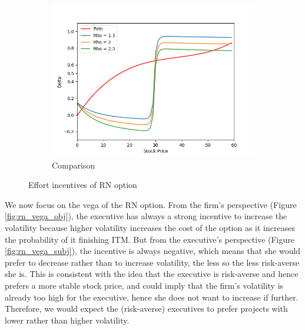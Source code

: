 \begin{figure}[H]
\begin{subfigure}{0.32\textwidth}
        \centering
        \includegraphics[width=\textwidth]{fig/4/delta_comp.png}
        \caption{Comparison}
        \label{fig:rn_delta_comp}
    \end{subfigure}
    \caption{Effort incentives of RN option}
    \label{fig:rn_delta_both}
\end{figure}
\vspace*{15pt}

We now focus on the vega of the RN option. From the firm's perspective (Figure \ref*{fig:rn_vega_obj}), the executive has always a strong incentive to increase the volatility because higher volatility increases the cost of the option as it increases the probability of it finishing ITM. But from the executive's perspective (Figure \ref*{fig:rn_vega_subj}), the incentive is always negative, which means that she would prefer to decrease rather than to increase volatility, the less so the less risk-averse she is. This is consistent with the idea that the executive is risk-averse and hence prefers a more stable stock price, and could imply that the firm's volatility is already too high for the executive, hence she does not want to increase if further. Therefore, we would expect the (risk-averse) executives to prefer projects with lower rather than higher volatility.

